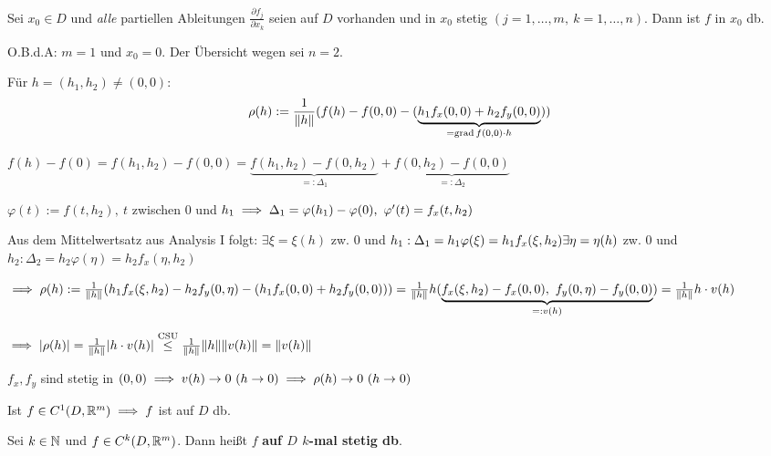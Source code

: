 \documentclass[a4paper,twoside,DIV15,BCOR12mm,chapterprefix=true,headings=twolinechapter]{scrbook}
\begin{document}
\begin{satz}
Sei $x_0 \in D$ und \emph{alle} partiellen Ableitungen $\frac{\partial f_j}{\partial x_k}$ seien auf $D$ vorhanden und in $x_0$ stetig $(j=1,\ldots,m,\ k=1,\ldots,n)$. Dann ist $f$ in $x_0$ db.
\end{satz}

\begin{beweis}
O.B.d.A: $m=1$ und $x_0=0$. Der Übersicht wegen sei $n=2$.

Für $h = (h_1,h_2) \ne (0,0):$ $$\rho(h) := \frac{1}{\|h\|}(f(h) - f(0,0) - (\underbrace{h_1 f_x(0,0) + h_2 f_y(0,0)}_{= \mathop{\rm grad}\nolimits f(0,0)\cdot h}))$$

$f(h) - f(0) = f(h_1,h_2) - f(0,0) = \underbrace{f(h_1,h_2) - f(0,h_2)}_{=:\Delta_1} + \underbrace{f(0,h_2) - f(0,0)}_{=:\Delta_2}$

$\varphi(t) := f(t,h_2),\ t$ zwischen $0$ und $h_1 \implies \Delta_1 = \varphi(h_1) - \varphi(0),\ \varphi'(t) = f_x(t,h_2)$

Aus dem Mittelwertsatz aus Analysis I folgt:
$\exists \xi = \xi(h)$ zw. $0$ und $h_1: \Delta_1 = h_1\varphi(\xi) = h_1 f_x(\xi,h_2)\\
\exists \eta = \eta(h)$ zw. $0$ und $h_2: \Delta_2 = h_2\varphi(\eta) = h_2 f_x(\eta,h_2)$

$\implies \rho(h) := \frac{1}{\|h\|}(h_1 f_x(\xi,h_2) - h_2 f_y(0,\eta) - (h_1 f_x(0,0) + h_2 f_y(0,0)))\\
= \frac{1}{\|h\|} h(\underbrace{f_x(\xi,h_2) - f_x(0,0),\ f_y(0,\eta) - f_y(0,0)}_{=:v(h)})
= \frac{1}{\|h\|} h\cdot v(h)$

$\implies |\rho(h)| = \frac{1}{\|h\|} |h\cdot v(h)| \overset{\text{CSU}}{\le} \frac{1}{\|h\|} \|h\| \|v(h)\| = \|v(h)\|$

$f_x,f_y$ sind stetig in $(0,0) \implies v(h) \to 0\ (h \to 0) \implies \rho(h) \to 0\ (h \to 0)$
\end{beweis}

\begin{folgerung}
Ist $f \in C^1(D,\mathbb{R}^m) \implies f$ ist auf $D$ db.
\end{folgerung}

\begin{definition*}
Sei $k \in \mathbb{N}$ und $f \in C^k(D,\mathbb{R}^m)$. Dann heißt $f$ \textbf{auf $D$ $k$-mal stetig db}.
\end{definition*}
\end{document}
